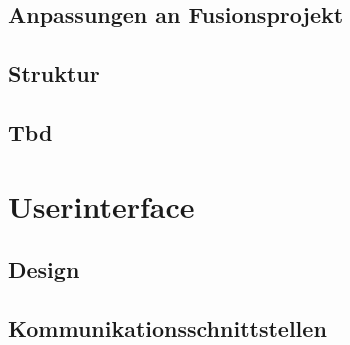 		\subsection{Anpassungen an Fusionsprojekt}
		\label{Implementierung:Server:Anpassungen}
		
		\subsection{Struktur}
		\label{Implementierung:Server:Struktur}
		
		\subsection{Tbd}
		
	\section{Userinterface}
	\label{Implementierung:Userinterface}
	
		\subsection{Design}
		\label{Implementierung:Userinterface:Design}
	
		\subsection{Kommunikationsschnittstellen}
		\label{Implementierung:Userinterface:Kommunikationsschnittstellen}
		
		
		
	
	